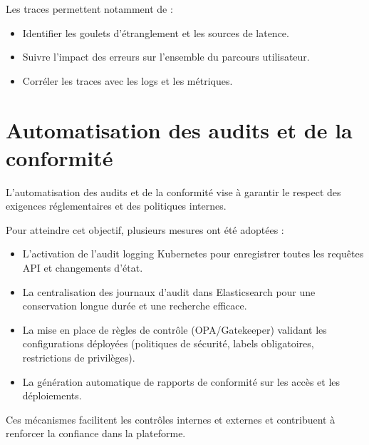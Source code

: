 Les traces permettent notamment de :
\begin{itemize}
	\item Identifier les goulets d’étranglement et les sources de latence.
	\item Suivre l’impact des erreurs sur l’ensemble du parcours utilisateur.
	\item Corréler les traces avec les logs et les métriques.
\end{itemize}

\section{Automatisation des audits et de la conformité}

L’automatisation des audits et de la conformité vise à garantir le respect des exigences réglementaires et des politiques internes.

Pour atteindre cet objectif, plusieurs mesures ont été adoptées :
\begin{itemize}
	\item L’activation de l’audit logging Kubernetes pour enregistrer toutes les requêtes API et changements d’état.
	\item La centralisation des journaux d’audit dans Elasticsearch pour une conservation longue durée et une recherche efficace.
	\item La mise en place de règles de contrôle (OPA/Gatekeeper) validant les configurations déployées (politiques de sécurité, labels obligatoires, restrictions de privilèges).
	\item La génération automatique de rapports de conformité sur les accès et les déploiements.
\end{itemize}

Ces mécanismes facilitent les contrôles internes et externes et contribuent à renforcer la confiance dans la plateforme.
